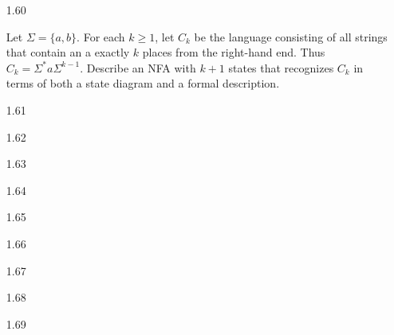 \begin{enumerate}

      \item [1.60]
            
            
            Let $\Sigma =\{a,b\}$. For each $k \ge 1$, let $C_k$ be the language consisting of all strings that contain an a exactly $k$ places from the right-hand end. Thus $C_k = \Sigma^\ast a \Sigma^{k-1}$. Describe an NFA with $k+1$ states that recognizes $C_k$ in terms of both a state diagram and a formal description.
            
      \item [1.61]
      \item [1.62]
      \item [1.63]
      \item [1.64]
      \item [1.65]
      \item [1.66]
      \item [1.67]
      \item [1.68]
      \item [1.69]
            
            
\end{enumerate}
